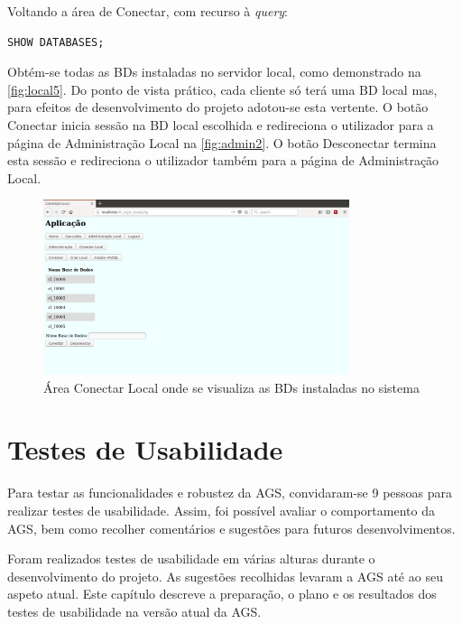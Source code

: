 \documentclass[11pt,twoside,a4paper]{report}
\begin{document}
Voltando a área de Conectar, com recurso à \textit{query}:
\begin{lstlisting}[language = SQL]
	SHOW DATABASES;
\end{lstlisting}
Obtém-se todas as BDs instaladas no servidor local, como demonstrado na \autoref{fig:local5}. Do ponto de vista prático, cada cliente só terá uma BD local mas, para efeitos de desenvolvimento do projeto adotou-se esta vertente. O botão Conectar inicia sessão na BD local escolhida e redireciona o utilizador para a página de Administração Local na \autoref{fig:admin2}. O botão Desconectar termina esta sessão e redireciona o utilizador também para a página de Administração Local.
\begin{figure}[H]
	\begin{center}
		\includegraphics[trim={0 3cm 0 0},clip,width=0.8\textwidth]{local05} %
		\caption[Área Conectar Local com BDs locais]{Área Conectar Local onde se visualiza as BDs instaladas no sistema}
		\label{fig:local5}
	\end{center}
\end{figure}

\cleardoublepage
\chapter{Testes de Usabilidade}
\label{chap:usabilidade}
Para testar as funcionalidades e robustez da AGS, convidaram-se 9 pessoas para realizar testes de usabilidade. Assim, foi possível avaliar o comportamento da AGS, bem como recolher comentários e sugestões para futuros desenvolvimentos.\par 
Foram realizados testes de usabilidade em várias alturas durante o desenvolvimento do projeto. As sugestões recolhidas levaram a AGS até ao seu aspeto atual. Este capítulo descreve a preparação, o plano e os resultados dos testes de usabilidade na versão atual da AGS.
\end{document}

